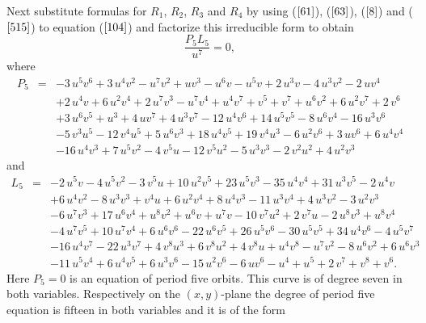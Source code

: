 \documentclass[12pt,a4paper]{amsart}
\numberwithin{equation}{section}
\numberwithin{lause}{section}
\begin{document}
Next substitute formulas for $R_{1}$, $R_{2}$, $R_{3}$ and $R_{4}$ by using ($\ref{61}$), ($\ref{63}$), ($\ref{8}$) and ($\ref{515}$) to equation ($\ref{104}$) and factorize this irreducible form to obtain
\begin{equation}
\frac{P_{5}L_{5}}{u^{7}}=0,\label{105}
\end{equation}
where
\begin{eqnarray}
     P_{5}&=&-3\,{u}^{5}{v}^{6}+3\,{u}^{4}{v}^{2}-{u}^{7}{v}^{2}+u{v}^{3}-{u}^{6}v-{u}^{5}v+2\,{u}^{3}v-4\,{u}^{3}{v}^{2}-2\,u{v}^{4} \nonumber \\
        &&+2\,{u}^{4}v+6\,{u}^{2}{v}^{4}+2\,{u}^{7}{v}^{3}-{u}^{7}{v}^{4}+{u}^{4}{v}^{7}+{v}^{5}+{v}^{7}+{u}^{6}{v}^{2}+6\,{u}^{2}{v}^{7}+2\,{v}^{6} \nonumber \\
        &&+3\,{u}^{6}{v}^{5}+{u}^{3}+4\,u{v}^{7}+4\,{u}^{3}{v}^{7}-12\,{u}^{4}{v}^{6}+14\,{u}^{5}{v}^{5}-8\,{u}^{6}{v}^{4}-16\,{u}^{3}{v}^{6} \\ \label{123}
        &&-5\,{v}^{3}{u}^{5}-12\,{v}^{4}{u}^{5}+5\,{u}^{6}{v}^{3}+18\,{u}^{4}{v}^{5}+19\,{v}^{4}{u}^{3}-6\,{u}^{2}{v}^{6}+3\,u{v}^{6}+6\,{u}^{4}{v}^{4} \nonumber \\
        &&-16\,{u}^{4}{v}^{3}+7\,{u}^{5}{v}^{2}-4\,{v}^{5}u-12\,{v}^{5}{u}^{2}-5\,{u}^{3}{v}^{3}-2\,{v}^{2}{u}^{2}+4\,{u}^{2}{v}^{3} \nonumber
\end{eqnarray}
and
\begin{eqnarray*}
L_{5}&=& -2\,{u}^{5}v-4\,{u}^{5}{v}^{2}-3\,{v}^{5}u+10\,{u}^{2}{v}^{5}+23\,{u}^{5}{v}^{3}-35\,{u}^{4}{v}^{4}+31\,{u}^{3}{v}^{5}-2\,{u}^{4}v\\
&&+6\,{u}^{4}{v}^{2}-8\,{u}^{3}{v}^{3}+{v}^{4}u+6\,{u}^{2}{v}^{4}+8\,{u}^{4}{v}^{3}-11\,{u}^{3}{v}^{4}+4\,{u}^{3}{v}^{2}-3\,{u}^{2}{v}^{3}\\
&&-6\,{u}^{7}{v}^{3}+17\,{u}^{6}{v}^{4}+{u}^{8}{v}^{2}+{u}^{6}v+{u}^{7}v-10\,{v}^{7}{u}^{2}+2\,{v}^{7}u-2\,{u}^{8}{v}^{3}+{u}^{8}{v}^{4}\\
&&-4\,{u}^{7}{v}^{5}+10\,{u}^{7}{v}^{4}+6\,{u}^{6}{v}^{6}-22\,{u}^{6}{v}^{5}+26\,{u}^{5}{v}^{6}-30\,{u}^{5}{v}^{5}+34\,{u}^{4}{v}^{6}-4\,{u}^{5}{v}^{7}\\
&&-16\,{u}^{4}{v}^{7}-22\,{u}^{3}{v}^{7}+4\,{v}^{8}{u}^{3}+6\,{v}^{8}{u}^{2}+4\,{v}^{8}u+{u}^{4}{v}^{8}-{u}^{7}{v}^{2}-8\,{u}^{6}{v}^{2}+6\,{u}^{6}{v}^{3}\\
&&-11\,{u}^{5}{v}^{4}+6\,{u}^{4}{v}^{5}+6\,{u}^{3}{v}^{6}-15\,{u}^{2}{v}^{6}-6\,u{v}^{6}-{u}^{4}+{u}^{5}+2\,{v}^{7}+{v}^{8}+{v}^{6}.
\end{eqnarray*}
  Here $P_{5}=0$ is an equation of period five orbits. This curve is of degree seven in both variables. Respectively on the $(x,y)$-plane the degree of period five equation is fifteen in both variables and it is of the form
\end{document}
